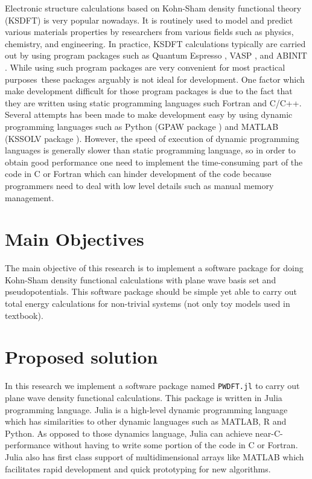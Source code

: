 \documentclass[a0,landscape]{a0poster}
\begin{document}
\begin{multicols}{3}
Electronic structure calculations based on Kohn-Sham density functional theory (KSDFT)
\cite{Hohenberg1964,Kohn1965} is very popular nowadays.
It is routinely used to model and predict various materials properties
\cite{Martin2004} by researchers from various fields
such as physics, chemistry, and engineering.
In practice, KSDFT calculations typically are carried out by using
program packages such as Quantum Espresso \cite{Giannozzi2009},
VASP \cite{Kresse1996a}, and
ABINIT \cite{Gonze2009}.
While using such program packages are very convenient for most practical
purposes\, these packages arguably
is not ideal for development.
One factor which make development difficult for those program packages is
due to the fact that they are written using static programming
languages such Fortran and C/C++.
Several attempts has been made to make development easy by using
dynamic programming languages such as Python (GPAW package \cite{Enkovaara2010})
and MATLAB (KSSOLV package \cite{Yang2009}).
However, the speed of execution of dynamic programming languages is generally
slower than static programming language, so in order to obtain good performance
one need to implement the time-consuming part of the code in C or Fortran which
can hinder development of the code because programmers need to deal with
low level details such as manual memory management.



\color{DarkSlateGray} %

\section*{Main Objectives}

The main objective of this research is to
implement a software package for doing Kohn-Sham density functional
calculations with plane wave basis set and pseudopotentials.
This software package should be simple yet able to carry out
total energy calculations for non-trivial systems (not only toy
models used in textbook).

\section*{Proposed solution}

In this research we implement a software package named \texttt{PWDFT.jl}
to carry out plane wave density functional calculations. This package
is written in Julia programming language. Julia is a high-level dynamic
programming language which has similarities to other dynamic languages
such as MATLAB, R and Python. As opposed to those dynamics language, Julia
can achieve near-C-performance without having to write some portion of the
code in C or Fortran. Julia also has first class support of multidimensional
arrays like MATLAB which facilitates rapid development and quick prototyping
for new algorithms.


\end{multicols}
\end{document}
